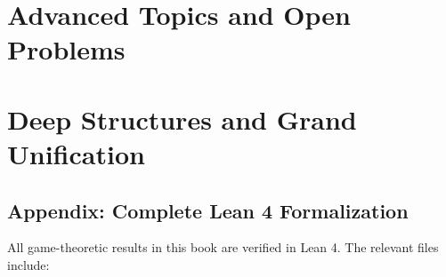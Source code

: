 \documentclass[11pt,oneside]{book}
\theoremstyle{plain}
\theoremstyle{definition}
\theoremstyle{remark}
\begin{document}


\part{Advanced Topics and Open Problems}



\part{Deep Structures and Grand Unification}




\chapter*{Appendix: Complete Lean 4 Formalization}

All game-theoretic results in this book are verified in Lean 4.
The relevant files include:
\end{document}
